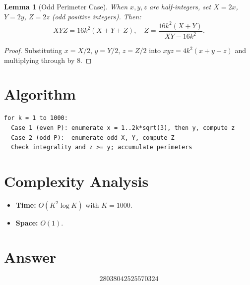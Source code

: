 \documentclass[12pt]{article}
\newtheorem{lemma}[theorem]{Lemma}
\begin{document}
\begin{lemma}[Odd Perimeter Case]
When $x,y,z$ are half-integers, set $X = 2x$, $Y = 2y$, $Z = 2z$ (odd positive integers). Then:
\[
XYZ = 16k^2(X+Y+Z), \quad Z = \frac{16k^2(X+Y)}{XY - 16k^2}.
\]
\end{lemma}

\begin{proof}
Substituting $x = X/2$, $y = Y/2$, $z = Z/2$ into $xyz = 4k^2(x+y+z)$ and multiplying through by 8.
\end{proof}

\section{Algorithm}

\begin{verbatim}
for k = 1 to 1000:
  Case 1 (even P): enumerate x = 1..2k*sqrt(3), then y, compute z
  Case 2 (odd P):  enumerate odd X, Y, compute Z
  Check integrality and z >= y; accumulate perimeters
\end{verbatim}

\section{Complexity Analysis}

\begin{itemize}
\item \textbf{Time:} $O(K^2 \log K)$ with $K = 1000$.
\item \textbf{Space:} $O(1)$.
\end{itemize}

\section{Answer}

\[
\boxed{28038042525570324}
\]
\end{document}
